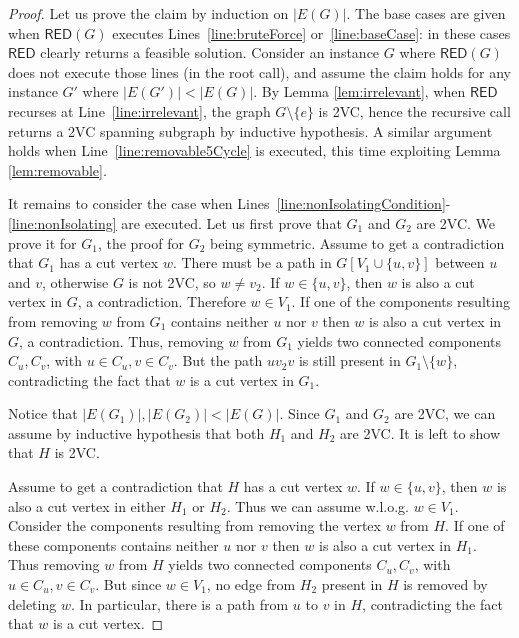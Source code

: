 \documentclass{article}
\newcommand{\RED}{\mathsf{RED}}
\begin{document}
\begin{proof}
 Let us prove the claim by induction on $|E(G)|$. The base cases are given when $\RED(G)$ executes Lines~\ref{line:bruteForce} or~\ref{line:baseCase}: in these cases $\RED$ clearly returns a feasible solution. Consider an instance $G$ where $\RED(G)$ does not execute those lines (in the root call), and assume the claim holds for any instance $G'$ where $|E(G')| < |E(G)|$.
 By Lemma \ref{lem:irrelevant}, when $\RED$ recurses at  Line~\ref{line:irrelevant}, the graph $G\setminus \{e\}$ is 2VC, hence the recursive call returns a 2VC spanning subgraph by inductive hypothesis. A similar argument holds when Line~\ref{line:removable5Cycle} is executed, this time exploiting Lemma \ref{lem:removable}.

It remains to consider the case when Lines~\ref{line:nonIsolatingCondition}-\ref{line:nonIsolating} are executed. Let us first prove that $G_1$ and $G_2$ are 2VC. We prove it for $G_1$, the proof for $G_2$ being symmetric. Assume to get a contradiction that $G_1$ has a cut vertex $w$. There must be a path in $G[V_1\cup\{u, v\}]$ between $u$ and $v$, otherwise $G$ is not 2VC, so $w\neq v_2$. If $w\in \{u, v\}$, then $w$ is also a cut vertex in $G$, a contradiction. Therefore $w\in V_1$. If one of the components resulting from removing $w$ from $G_1$ contains neither $u$ nor $v$ then $w$ is also a cut vertex in $G$, a contradiction. Thus, removing $w$ from $G_1$ yields two connected components $C_u, C_v$, with $u\in C_u, v\in C_v$. But the path $uv_2v$ is still present in $G_1\setminus\{w\}$, contradicting the fact that $w$ is a cut vertex in $G_1$.

Notice that $|E(G_1)|, |E(G_2)| < |E(G)|$. Since $G_1$ and $G_2$ are 2VC, we can assume by inductive hypothesis that both $H_1$ and $H_2$ are 2VC. It is left to show that $H$ is 2VC.

Assume to get a contradiction that $H$ has a cut vertex $w$. If $w\in\{u, v\}$, then $w$ is also a cut vertex in either $H_1$ or $H_2$. Thus we can assume w.l.o.g. $w\in V_1$. Consider the components resulting from removing the vertex $w$ from $H$. If one of these components contains neither $u$ nor $v$ then $w$ is also a cut vertex in $H_1$. Thus removing $w$ from $H$ yields two connected components $C_u, C_v$, with $u\in C_u, v\in C_v$. But since $w\in V_1$, no edge from $H_2$ present in $H$ is removed by deleting $w$. In particular, there is a path from $u$ to $v$ in $H$, contradicting the fact that $w$ is a cut vertex.
\end{proof}
\end{document}
